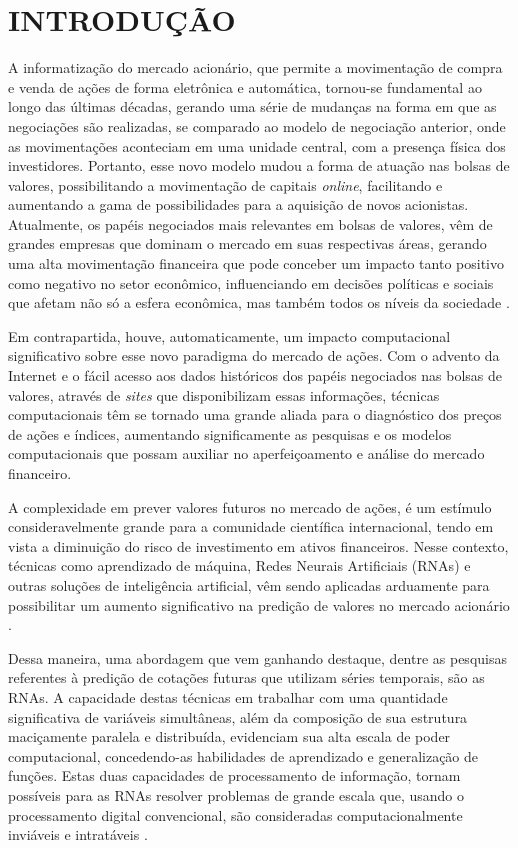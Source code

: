 
\chapter{INTRODUÇÃO}\label{ch:introducao}

A informatização do mercado acionário, que permite a movimentação de compra e venda de ações de forma eletrônica e automática, tornou-se fundamental ao longo das últimas décadas, gerando uma série de mudanças na forma em que as negociações são realizadas, se comparado ao modelo de negociação anterior, onde as movimentações aconteciam em uma unidade central, com a presença física dos investidores. Portanto, esse novo modelo mudou a forma de atuação nas bolsas de valores, possibilitando a movimentação de capitais \textit{online}, facilitando e aumentando a gama de possibilidades para a aquisição de novos acionistas. Atualmente, os papéis negociados mais relevantes em bolsas de valores, vêm de grandes empresas que dominam o mercado em suas respectivas áreas, gerando uma alta movimentação financeira que pode conceber um impacto tanto positivo como negativo no setor econômico, influenciando em decisões políticas e sociais que afetam não só a esfera econômica, mas também todos os níveis da sociedade \cite{shiller}.

Em contrapartida, houve, automaticamente, um impacto computacional significativo sobre esse novo paradigma do mercado de ações. Com o advento da Internet e o fácil acesso aos dados históricos dos papéis negociados nas bolsas de valores, através de \textit{sites} que disponibilizam essas informações, técnicas computacionais têm se tornado uma grande aliada para o diagnóstico dos preços de ações e índices, aumentando significamente as pesquisas e os modelos computacionais que possam auxiliar no aperfeiçoamento e análise do mercado financeiro.

A complexidade em prever valores futuros no mercado de ações, é um estímulo consideravelmente grande para a comunidade científica internacional, tendo em vista a diminuição do risco de investimento em ativos financeiros. Nesse contexto, técnicas como aprendizado de máquina, Redes Neurais Artificiais (RNAs) e outras soluções de inteligência artificial, vêm sendo aplicadas arduamente para possibilitar um aumento significativo na predição de valores no mercado acionário \cite{gambogi}.

Dessa maneira, uma abordagem que vem ganhando destaque, dentre as pesquisas referentes à predição de cotações futuras que utilizam séries temporais, são as RNAs. A capacidade destas técnicas em trabalhar com uma quantidade significativa de variáveis simultâneas, além da composição de sua estrutura maciçamente paralela e distribuída, evidenciam sua alta escala de poder computacional, concedendo-as habilidades de aprendizado e generalização de funções. Estas duas capacidades de processamento de informação, tornam possíveis para as RNAs resolver problemas de grande escala que, usando o processamento digital convencional, são consideradas computacionalmente inviáveis e intratáveis \cite{elpink, haykin2000}.

